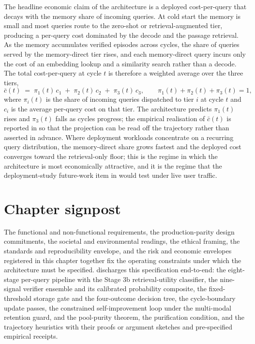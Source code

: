 The headline economic claim of the architecture is a deployed cost-per-query that decays with the memory share of incoming queries. At cold start the memory is small and most queries route to the zero-shot or retrieval-augmented tier, producing a per-query cost dominated by the decode and the passage retrieval. As the memory accumulates verified episodes across cycles, the share of queries served by the memory-direct tier rises, and each memory-direct query incurs only the cost of an embedding lookup and a similarity search rather than a decode. The total cost-per-query at cycle $t$ is therefore a weighted average over the three tiers,
\begin{equation}
\bar{c}(t) \;=\; \pi_{1}(t)\, c_{1} \;+\; \pi_{2}(t)\, c_{2} \;+\; \pi_{3}(t)\, c_{3},
\qquad \pi_{1}(t) + \pi_{2}(t) + \pi_{3}(t) = 1,
\label{eq:deployment-cost}
\end{equation}
where $\pi_{i}(t)$ is the share of incoming queries dispatched to tier $i$ at cycle $t$ and $c_{i}$ is the average per-query cost on that tier. The architecture predicts $\pi_{1}(t)$ rises and $\pi_{3}(t)$ falls as cycles progress; the empirical realisation of $\bar{c}(t)$ is reported in  so that the projection can be read off the trajectory rather than asserted in advance. Where deployment workloads concentrate on a recurring query distribution, the memory-direct share grows fastest and the deployed cost converges toward the retrieval-only floor; this is the regime in which the architecture is most economically attractive, and it is the regime that the deployment-study future-work item in  would test under live user traffic.

\section{Chapter signpost}
\label{sec:ch3-signpost}

The functional and non-functional requirements, the production-parity design commitments, the societal and environmental readings, the ethical framing, the standards and reproducibility envelope, and the risk and economic envelopes registered in this chapter together fix the operating constraints under which the architecture must be specified.  discharges this specification end-to-end: the eight-stage per-query pipeline with the Stage 3b retrieval-utility classifier, the nine-signal verifier ensemble and its calibrated probability composite, the fixed-threshold storage gate and the four-outcome decision tree, the cycle-boundary update passes, the constrained self-improvement loop under the multi-modal retention guard, and the pool-purity theorem, the purification condition, and the trajectory heuristics with their proofs or argument sketches and pre-specified empirical receipts.
